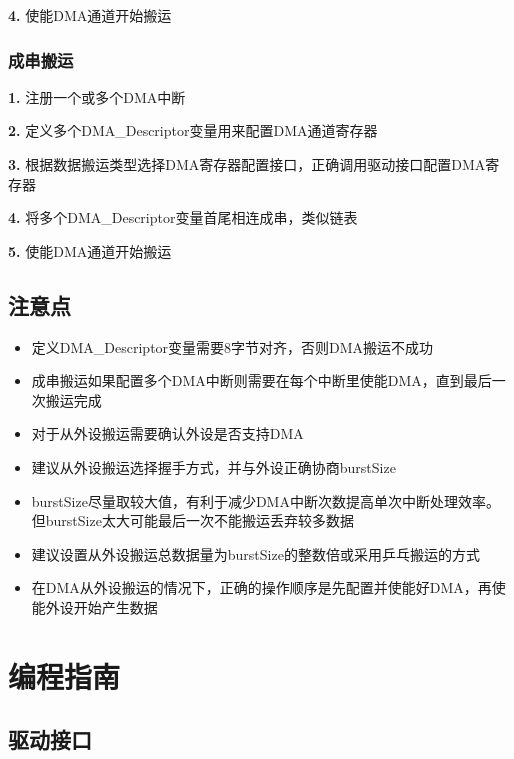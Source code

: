 \documentclass[
  12pt,
]{book}
\begin{document}
\textbf{4.} 使能DMA通道开始搬运

\hypertarget{ux6210ux4e32ux642cux8fd0}{%
\subsubsection{成串搬运}\label{ux6210ux4e32ux642cux8fd0}}

\textbf{1.} 注册一个或多个DMA中断

\textbf{2.} 定义多个DMA\_Descriptor变量用来配置DMA通道寄存器

\textbf{3.} 根据数据搬运类型选择DMA寄存器配置接口，正确调用驱动接口配置DMA寄存器

\textbf{4.} 将多个DMA\_Descriptor变量首尾相连成串，类似链表

\textbf{5.} 使能DMA通道开始搬运

\hypertarget{ux6ce8ux610fux70b9}{%
\subsection{注意点}\label{ux6ce8ux610fux70b9}}

\begin{itemize}
\item
  定义DMA\_Descriptor变量需要8字节对齐，否则DMA搬运不成功
\item
  成串搬运如果配置多个DMA中断则需要在每个中断里使能DMA，直到最后一次搬运完成
\item
  对于从外设搬运需要确认外设是否支持DMA
\item
  建议从外设搬运选择握手方式，并与外设正确协商burstSize
\item
  burstSize尽量取较大值，有利于减少DMA中断次数提高单次中断处理效率。但burstSize太大可能最后一次不能搬运丢弃较多数据
\item
  建议设置从外设搬运总数据量为burstSize的整数倍或采用乒乓搬运的方式
\item
  在DMA从外设搬运的情况下，正确的操作顺序是先配置并使能好DMA，再使能外设开始产生数据
\end{itemize}

\hypertarget{ux7f16ux7a0bux6307ux5357}{%
\section{编程指南}\label{ux7f16ux7a0bux6307ux5357}}

\hypertarget{ux9a71ux52a8ux63a5ux53e3}{%
\subsection{驱动接口}\label{ux9a71ux52a8ux63a5ux53e3}}
\end{document}
